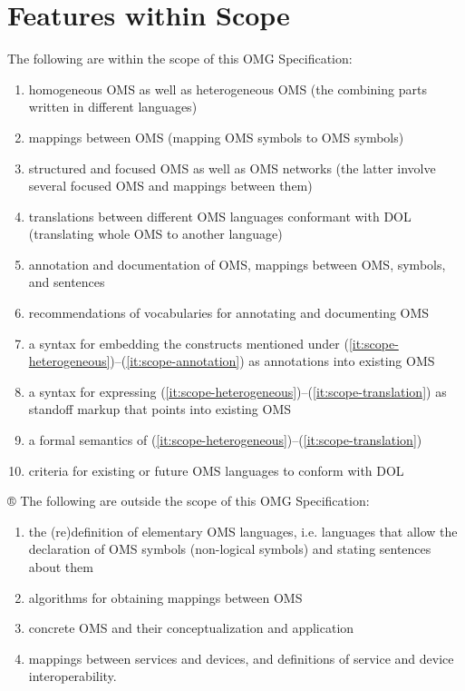 \documentclass[10pt,%
\ifpretendfinal
final%
\else
draft%
\fi,
]{scrreprt}
\makeatletter
\newcommand*{\ie}{i.e.\@\xspace}
\newcommand*\CommentAuthor{}
\renewcommand*\CommentAuthor{#1}}
\newcommand*\CommentDate{}
\renewcommand*\CommentDate{#1}}
\newcommand*\CommentId{}
\renewcommand*\CommentId{#1}}
\newcommand*\CommentType{}
\renewcommand*\CommentType{#1}}
\newcommand*{\SetCommentColorByType}[1]{%
\edef\localType{{#1}}%
\expandafter\ifstrequal\localType{q-aut}{\colorlet{CommentColor}{red}}{%
\expandafter\ifstrequal\localType{q-all}{\colorlet{CommentColor}{orange}}{%
\expandafter\ifstrequal\localType{todo}{\colorlet{CommentColor}{orange}}{%
\expandafter\ifstrequal\localType{fyi}{\colorlet{CommentColor}{lightgray}}{%
\colorlet{CommentColor}{yellow}}}}}}
\newcommand*{\SetCommentPrefixByType}[1]{%
\edef\localType{{#1}}%
\expandafter\@ifmtarg\localType{%
\edef\CommentPrefix{}%
}{%
\caseupper[q]{#1}%
\edef\CommentPrefix{\thestring: }%
}}
\newcommand*{\initComment}[1]{%
\setkeys{Comment}{#1}%
\SetCommentColorByType{\CommentType}%
\relax%
\SetCommentPrefixByType{\CommentType}%
\relax%
}
\newcommand*{\todonote}[2][]{%
\initComment{#1}%
\pdfcomment[author=\CommentAuthor,color=CommentColor,date=\CommentDate,id=\CommentId]{%
\CommentPrefix
#2}}
\renewcommand*{\todonote}[2][]{%
\initComment{#1}%
\ednote{\CommentPrefix #2}}
\newcommand*{\IS}{OMG Specification\xspace}
\makeatother
\begin{document}
\section{Features within Scope}
The following are within the scope of this \IS:
\begin{enumerate}
\item\label{it:scope-heterogeneous} homogeneous OMS as well as heterogeneous OMS (the combining parts written in different languages)
\item mappings between OMS (mapping
OMS symbols to OMS symbols)
\item structured and focused OMS as well as OMS networks (the latter involve several focused OMS and mappings between them)
\item \label{it:scope-translation} translations between different OMS languages conformant with DOL (translating whole OMS to another language)
\item\label{it:scope-annotation} annotation and documentation of OMS, mappings between OMS, symbols,
and sentences
\item recommendations of vocabularies for annotating and documenting OMS
\item a syntax for embedding the constructs mentioned under (\ref{it:scope-heterogeneous})–(\ref{it:scope-annotation}) as annotations into existing OMS
\item a syntax for expressing (\ref{it:scope-heterogeneous})–(\ref{it:scope-translation}) as standoff markup that points into existing OMS
\item a formal semantics of (\ref{it:scope-heterogeneous})–(\ref{it:scope-translation})
\item criteria for existing or future OMS languages to conform with DOL
\end{enumerate}

®
The following are outside the scope of this \IS:
\begin{enumerate}
\item the (re)definition of elementary OMS languages, \ie languages that allow the declaration of OMS symbols (non-logical symbols) 
and
stating sentences about them
\item algorithms for obtaining mappings between OMS
\item concrete OMS and their conceptualization and application
\item mappings between services and devices, and definitions of service and device interoperability.
\end{enumerate}
\end{document}

